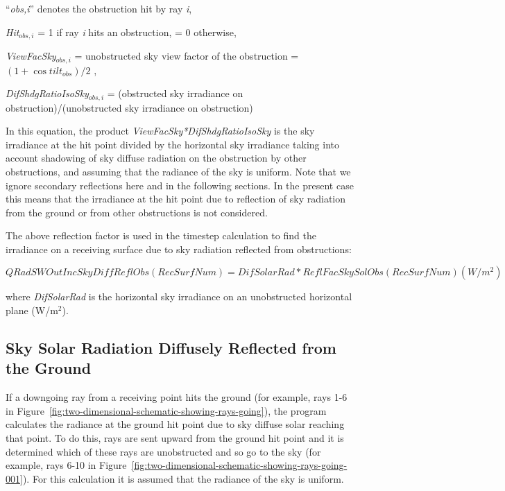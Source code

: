 ``\emph{obs,i}'' denotes the obstruction hit by ray \emph{i},

\emph{Hit\(_{obs,i}\)} = 1 if ray \emph{i} hits an obstruction, = 0 otherwise,

\emph{ViewFacSky\(_{obs,i}\)} = unobstructed sky view factor of the obstruction = \((1 + \cos til{t_{obs}})/2\) ,

\emph{DifShdgRatioIsoSky\(_{obs,i}\)} = (obstructed sky irradiance on obstruction)/(unobstructed sky irradiance on obstruction)

In this equation, the product \emph{ViewFacSky*DifShdgRatioIsoSky} is the sky irradiance at the hit point divided by the horizontal sky irradiance taking into account shadowing of sky diffuse radiation on the obstruction by other obstructions, and assuming that the radiance of the sky is uniform. Note that we ignore secondary reflections here and in the following sections. In the present case this means that the irradiance at the hit point due to reflection of sky radiation from the ground or from other obstructions is not considered.

The above reflection factor is used in the timestep calculation to find the irradiance on a receiving surface due to sky radiation reflected from obstructions:

\begin{equation}
QRadSWOutIncSkyDiffReflObs(RecSurfNum) = DifSolarRad * ReflFacSkySolObs(RecSurfNum) (W/m^{2})
\end{equation}

where \emph{DifSolarRad} is the horizontal sky irradiance on an unobstructed horizontal plane (W/m\(^{2}\)).

\subsection{Sky Solar Radiation Diffusely Reflected from the Ground}\label{sky-solar-radiation-diffusely-reflected-from-the-ground}

If a downgoing ray from a receiving point hits the ground (for example, rays 1-6 in Figure~\ref{fig:two-dimensional-schematic-showing-rays-going}), the program calculates the radiance at the ground hit point due to sky diffuse solar reaching that point. To do this, rays are sent upward from the ground hit point and it is determined which of these rays are unobstructed and so go to the sky (for example, rays 6-10 in Figure~\ref{fig:two-dimensional-schematic-showing-rays-going-001}). For this calculation it is assumed that the radiance of the sky is uniform.

